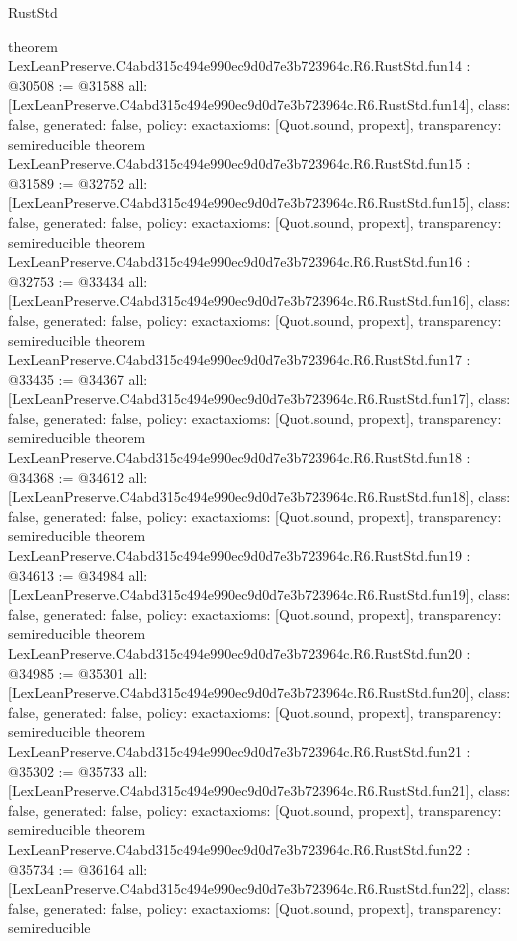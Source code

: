 \begin{lexlean}{RustStd}
\begin{coremodule}
{}
theorem LexLeanPreserve.C4abd315c494e990ec9d0d7e3b723964c.R6.RustStd.fun14 : @30508 := @31588 {
  all: [LexLeanPreserve.C4abd315c494e990ec9d0d7e3b723964c.R6.RustStd.fun14],
  class: false,
  generated: false,
  policy: exact{axioms: [Quot.sound, propext]},
  transparency: semireducible
}
theorem LexLeanPreserve.C4abd315c494e990ec9d0d7e3b723964c.R6.RustStd.fun15 : @31589 := @32752 {
  all: [LexLeanPreserve.C4abd315c494e990ec9d0d7e3b723964c.R6.RustStd.fun15],
  class: false,
  generated: false,
  policy: exact{axioms: [Quot.sound, propext]},
  transparency: semireducible
}
theorem LexLeanPreserve.C4abd315c494e990ec9d0d7e3b723964c.R6.RustStd.fun16 : @32753 := @33434 {
  all: [LexLeanPreserve.C4abd315c494e990ec9d0d7e3b723964c.R6.RustStd.fun16],
  class: false,
  generated: false,
  policy: exact{axioms: [Quot.sound, propext]},
  transparency: semireducible
}
theorem LexLeanPreserve.C4abd315c494e990ec9d0d7e3b723964c.R6.RustStd.fun17 : @33435 := @34367 {
  all: [LexLeanPreserve.C4abd315c494e990ec9d0d7e3b723964c.R6.RustStd.fun17],
  class: false,
  generated: false,
  policy: exact{axioms: [Quot.sound, propext]},
  transparency: semireducible
}
theorem LexLeanPreserve.C4abd315c494e990ec9d0d7e3b723964c.R6.RustStd.fun18 : @34368 := @34612 {
  all: [LexLeanPreserve.C4abd315c494e990ec9d0d7e3b723964c.R6.RustStd.fun18],
  class: false,
  generated: false,
  policy: exact{axioms: [Quot.sound, propext]},
  transparency: semireducible
}
theorem LexLeanPreserve.C4abd315c494e990ec9d0d7e3b723964c.R6.RustStd.fun19 : @34613 := @34984 {
  all: [LexLeanPreserve.C4abd315c494e990ec9d0d7e3b723964c.R6.RustStd.fun19],
  class: false,
  generated: false,
  policy: exact{axioms: [Quot.sound, propext]},
  transparency: semireducible
}
theorem LexLeanPreserve.C4abd315c494e990ec9d0d7e3b723964c.R6.RustStd.fun20 : @34985 := @35301 {
  all: [LexLeanPreserve.C4abd315c494e990ec9d0d7e3b723964c.R6.RustStd.fun20],
  class: false,
  generated: false,
  policy: exact{axioms: [Quot.sound, propext]},
  transparency: semireducible
}
theorem LexLeanPreserve.C4abd315c494e990ec9d0d7e3b723964c.R6.RustStd.fun21 : @35302 := @35733 {
  all: [LexLeanPreserve.C4abd315c494e990ec9d0d7e3b723964c.R6.RustStd.fun21],
  class: false,
  generated: false,
  policy: exact{axioms: [Quot.sound, propext]},
  transparency: semireducible
}
theorem LexLeanPreserve.C4abd315c494e990ec9d0d7e3b723964c.R6.RustStd.fun22 : @35734 := @36164 {
  all: [LexLeanPreserve.C4abd315c494e990ec9d0d7e3b723964c.R6.RustStd.fun22],
  class: false,
  generated: false,
  policy: exact{axioms: [Quot.sound, propext]},
  transparency: semireducible
}
\end{coremodule}
\end{lexlean}

